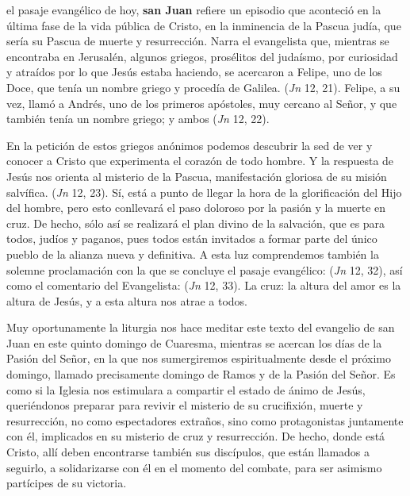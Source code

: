 \begin{body}
 el pasaje evangélico de hoy, \textbf{san Juan} refiere un episodio que aconteció en la última fase de la vida pública de Cristo, en la inminencia de la Pascua judía, que sería su Pascua de muerte y resurrección. Narra el evangelista que, mientras se encontraba en Jerusalén, algunos griegos, prosélitos del judaísmo, por curiosidad y atraídos por lo que Jesús estaba haciendo, se acercaron a Felipe, uno de los Doce, que tenía un nombre griego y procedía de Galilea.  (\textit{Jn} 12, 21). Felipe, a su vez, llamó a Andrés, uno de los primeros apóstoles, muy cercano al Señor, y que también tenía un nombre griego; y ambos  (\textit{Jn} 12, 22).

En la petición de estos griegos anónimos podemos descubrir la sed de ver y conocer a Cristo que experimenta el corazón de todo hombre. Y la respuesta de Jesús nos orienta al misterio de la Pascua, manifestación gloriosa de su misión salvífica.  (\textit{Jn} 12, 23). Sí, está a punto de llegar la hora de la glorificación del Hijo del hombre, pero esto conllevará el paso doloroso por la pasión y la muerte en cruz. De hecho, sólo así se realizará el plan divino de la salvación, que es para todos, judíos y paganos, pues todos están invitados a formar parte del único pueblo de la alianza nueva y definitiva. A esta luz comprendemos también la solemne proclamación con la que se concluye el pasaje evangélico:  (\textit{Jn} 12, 32), así como el comentario del Evangelista:  (\textit{Jn} 12, 33). La cruz: la altura del amor es la altura de Jesús, y a esta altura nos atrae a todos.

Muy oportunamente la liturgia nos hace meditar este texto del evangelio de san Juan en este quinto domingo de Cuaresma, mientras se acercan los días de la Pasión del Señor, en la que nos sumergiremos espiritualmente desde el próximo domingo, llamado precisamente domingo de Ramos y de la Pasión del Señor. Es como si la Iglesia nos estimulara a compartir el estado de ánimo de Jesús, queriéndonos preparar para revivir el misterio de su crucifixión, muerte y resurrección, no como espectadores extraños, sino como protagonistas juntamente con él, implicados en su misterio de cruz y resurrección. De hecho, donde está Cristo, allí deben encontrarse también sus discípulos, que están llamados a seguirlo, a solidarizarse con él en el momento del combate, para ser asimismo partícipes de su victoria.


\end{body}
